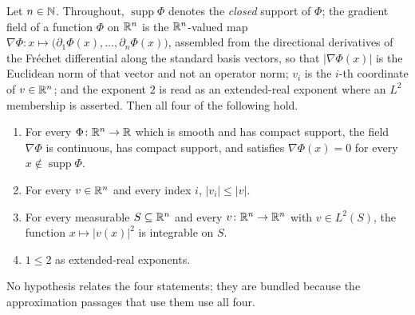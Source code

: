 \begin{helper}
Let $n\in\mathbb{N}$.  Throughout, $\operatorname{supp}\Phi$ denotes the \emph{closed}
support of $\Phi$; the gradient field of a function $\Phi$ on $\mathbb{R}^n$ is the
$\mathbb{R}^n$-valued map
$\nabla\Phi\colon x\mapsto\bigl(\partial_1\Phi(x),\dots,\partial_n\Phi(x)\bigr)$,
assembled from the directional derivatives of the Fréchet differential along
the standard basis vectors, so that $|\nabla\Phi(x)|$ is the Euclidean norm of
that vector and not an operator norm; $v_i$ is the $i$-th coordinate of
$v\in\mathbb{R}^n$; and the exponent $2$ is read as an extended-real exponent where an
$L^2$ membership is asserted.  Then all four of the following hold.
\begin{enumerate}
\item For every $\Phi\colon\mathbb{R}^n\to\mathbb{R}$ which is smooth and has compact support,
  the field $\nabla\Phi$ is continuous, has compact support, and satisfies
  $\nabla\Phi(x)=0$ for every $x\notin\operatorname{supp}\Phi$.
\item For every $v\in\mathbb{R}^n$ and every index $i$, $|v_i|\le|v|$.
\item For every measurable $S\subseteq\mathbb{R}^n$ and every
  $v\colon\mathbb{R}^n\to\mathbb{R}^n$ with $v\in L^2(S)$, the function $x\mapsto|v(x)|^2$ is
  integrable on $S$.
\item $1\le2$ as extended-real exponents.
\end{enumerate}
No hypothesis relates the four statements; they are bundled because the
approximation passages that use them use all four.
\end{helper}
